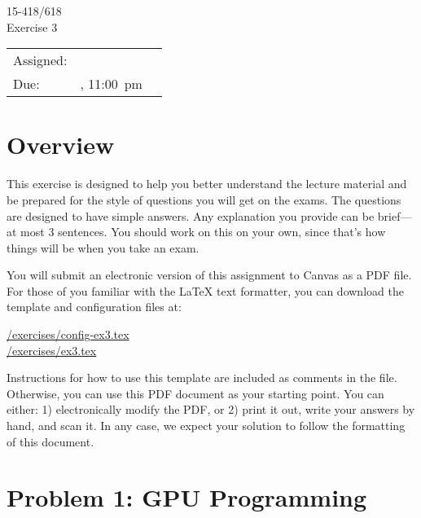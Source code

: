 \documentclass[11pt]{article}
\newcommand{\cref}[2]{\href{#1}{\color{blue}#2}}
\begin{document}
\begin{flushright}

\end{flushright}
\vspace*{0.3in}
\begin{center}
\LARGE
15-418/618 \thisterm{} \\
Exercise 3
\\ 
\end{center}

\begin{center}
\Large
\begin{tabular}{lll}
\hline
Assigned: & \dateassigned{} \\
Due: &  \datedueregistered{}, 11:00~pm\\
\hline
\end{tabular}
\end{center}

\section*{Overview}

This exercise is designed to help you better understand the lecture
material and be prepared for the style of questions you will get on
the exams.  The questions are designed to have simple answers.  Any
explanation you provide can be brief---at most 3 sentences.
You should work on this on your own, since that's how things will be when
you take an exam.

You will submit an electronic version of this assignment to Canvas as
a PDF file.  For those of you familiar with the \LaTeX{} text formatter, you can download the template and configuration files at:
\begin{center}
  \cref{\actualcoursehome/exercises/config-ex3.tex}{\visiblecoursehome/exercises/config-ex3.tex}\\
  \cref{\actualcoursehome/exercises/ex3.tex}{\visiblecoursehome/exercises/ex3.tex}
\end{center}
Instructions for how to use this template are included as comments in the file.  Otherwise,
you can use this PDF document as your starting point.
You can either: 1) electronically modify the PDF, or 2) print it
out, write your answers by hand, and scan it.  In any case, we expect
your solution to follow the formatting of this document.

\newpage
\section*{Problem 1: GPU Programming}
\end{document}
